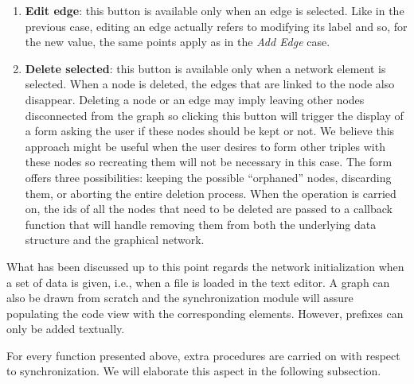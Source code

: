 \begin{enumerate}
	\item \textbf{Edit edge}: this button is available only when an edge is selected. Like in the previous case, editing an edge actually refers to modifying its label and so, for the new value, the same points apply as in the \textit{Add Edge} case.
	
	\item \textbf{Delete selected}: this button is available only when a network element is selected. When a node is deleted, the edges that are linked to the node also disappear. Deleting a node or an edge may imply leaving other nodes disconnected from the graph so clicking this button will trigger the display of a form asking the user if these nodes should be kept or not. We believe this approach might be useful when the user desires to form other triples with these nodes so recreating them will not be necessary in this case. The form offers three possibilities: keeping the possible ``orphaned'' nodes, discarding them, or aborting the entire deletion process. When the operation is carried on, the ids of all the nodes that need to be deleted are passed to a callback function that will handle removing them from both the underlying data structure and the graphical network.
\end{enumerate}

What has been discussed up to this point regards the network initialization when a set of data is given, i.e., when a file is loaded in the text editor. A graph can also be drawn from scratch and the synchronization module will assure populating the code view with the corresponding elements. However, prefixes can only be added textually.

For every function presented above, extra procedures are carried on with respect to synchronization. We will elaborate this aspect in the following subsection.

